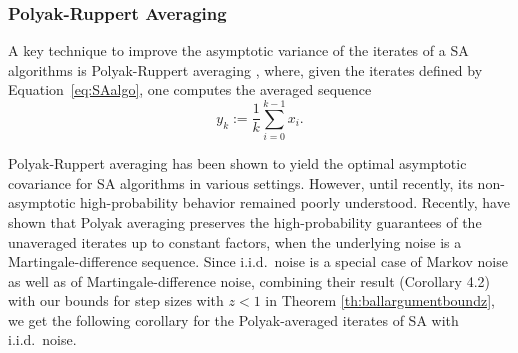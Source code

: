 \documentclass{article}
\newcommand{\lrp}[1]{\left( #1 \right)}
\newcommand{\N}{\mathbb{N}}
\newtheorem{theorem}{Theorem}[section]
\begin{document}

\subsubsection{Polyak-Ruppert Averaging}
A key technique to improve the asymptotic variance of the iterates of a SA algorithms is Polyak-Ruppert averaging \citep{polyak1992acceleration}, where, given the iterates defined by Equation~\eqref{eq:SAalgo}, one computes the averaged sequence
\[ y_k := \frac{1}{k} \sum\limits_{i=0}^{k-1} x_i. \]

Polyak-Ruppert averaging has been shown to yield the optimal asymptotic covariance for SA algorithms in various settings. However, until recently, its non-asymptotic high-probability behavior remained poorly understood. Recently, \citet[Theorem 4.1]{khodadadian2025general} have shown that Polyak averaging preserves the high-probability guarantees of the unaveraged iterates up to constant factors, when the underlying noise is a Martingale-difference sequence. Since i.i.d.\ noise is a special case of Markov noise as well as of Martingale-difference noise, combining their result (Corollary 4.2) with our bounds for step sizes with $z < 1$ in Theorem \ref{th:ballargumentboundz}, we get the following corollary for the Polyak-averaged iterates of SA with i.i.d.\ noise.
\end{document}
